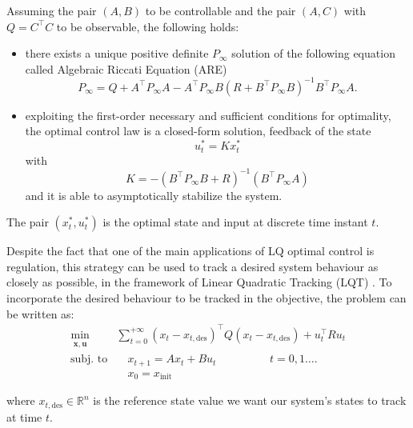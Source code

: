 \documentclass[a4paper,12pt,oneside]{book}
\begin{document}
\bigskip
Assuming the pair $(A,B)$ to be controllable and the pair $(A,C)$ with $Q = C^\top C$ to be observable, the following holds:
\begin{itemize}
    \item there exists a unique positive definite $P_\infty$ solution of the following equation called Algebraic Riccati Equation (ARE)
    \begin{equation}
        P_\infty = Q + A^\top P_\infty A - A^\top P_\infty B (R + B^\top P_\infty B)^{-1} B^\top P_\infty A.
    \end{equation}
    \item exploiting the first-order necessary and sufficient conditions for optimality, the optimal control law is a closed-form solution, feedback of the state
    \begin{equation}
        u_t^* = K x_t^*
    \end{equation}
    with
    \begin{equation}
        K = -( B^\top P_\infty B + R)^{-1}(B^\top P_\infty A)
    \label{eq:Regulator_LQR}
    \end{equation}
    and it is able to asymptotically stabilize the system.
\end{itemize}

The pair $(x_t^*, u_t^*)$ is the optimal state and input at discrete time instant $t$.

\bigskip
Despite the fact that one of the main applications of LQ optimal control is regulation, this strategy can be used to track a desired system behaviour as closely as possible, in the framework of Linear Quadratic Tracking (LQT) \cite{Linear_Quadratic_Tracking}.
To incorporate the desired behaviour to be tracked in the objective, the problem can be written as:
\begin{equation}
\begin{aligned}
	\min_{\substack{\boldsymbol{x}, \boldsymbol{u}}}\quad & \sum_{t=0}^{+\infty}  (x_t - x_{t,\text{des}})^\top Q (x_t - x_{t,\text{des}}) + u_t^\top R u_t  \\
	\text{subj. to} & \quad x_{t+1}  = A x_t + B u_t \hspace{2cm} t = 0, 1 \ldots. \\
    & \quad x_0 = x_{\text{init}}
\end{aligned}
\label{eq:LQR}
\end{equation}

where $x_{t,\text{des}} \in \mathbb{R}^n$ is the reference state value we want our system's states to track at time $t$.
\end{document}
